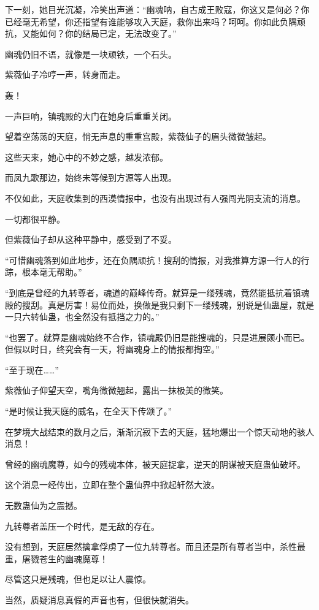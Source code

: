\begin{this_body}
下一刻，她目光沉凝，冷笑出声道：“幽魂呐，自古成王败寇，你这又是何必？你已经毫无希望，你还指望有谁能够攻入天庭，救你出来吗？呵呵。你如此负隅顽抗，又能如何？你的结局已定，无法改变了。”

幽魂仍旧不语，就像是一块顽铁，一个石头。

紫薇仙子冷哼一声，转身而走。

轰！

一声巨响，镇魂殿的大门在她身后重重关闭。

望着空荡荡的天庭，悄无声息的重重宫殿，紫薇仙子的眉头微微皱起。

这些天来，她心中的不妙之感，越发浓郁。

而凤九歌那边，始终未等候到方源等人出现。

不仅如此，天庭收集到的西漠情报中，也没有出现过有人强闯光阴支流的消息。

一切都很平静。

但紫薇仙子却从这种平静中，感受到了不妥。

“可惜幽魂落到如此地步，还在负隅顽抗！搜刮的情报，对我推算方源一行人的行踪，根本毫无帮助。”

“到底是曾经的九转尊者，魂道的巅峰传奇。就算是一缕残魂，竟然能抵抗着镇魂殿的搜刮。真是厉害！易位而处，换做是我只剩下一缕残魂，别说是仙蛊屋，就是一只六转仙蛊，也全然没有抵挡之力的。”

“也罢了。就算是幽魂始终不合作，镇魂殿仍旧是能搜魂的，只是进展颇小而已。但假以时日，终究会有一天，将幽魂身上的情报都掏空。”

“至于现在……”

紫薇仙子仰望天空，嘴角微微翘起，露出一抹极美的微笑。

“是时候让我天庭的威名，在全天下传颂了。”

在梦境大战结束的数月之后，渐渐沉寂下去的天庭，猛地爆出一个惊天动地的骇人消息！

曾经的幽魂魔尊，如今的残魂本体，被天庭捉拿，逆天的阴谋被天庭蛊仙破坏。

这个消息一经传出，立即在整个蛊仙界中掀起轩然大波。

无数蛊仙为之震撼。

九转尊者盖压一个时代，是无敌的存在。

没有想到，天庭居然擒拿俘虏了一位九转尊者。而且还是所有尊者当中，杀性最重，屠戮苍生的幽魂魔尊！

尽管这只是残魂，但也足以让人震惊。

当然，质疑消息真假的声音也有，但很快就消失。


\end{this_body}
